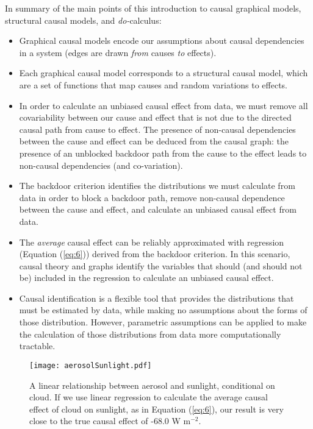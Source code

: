 \documentclass[12pt]{article}
\begin{document}
In summary of the main points of this introduction to causal graphical
models, structural causal models, and \textit{do-}calculus:

\begin{itemize}
\item Graphical causal models encode our assumptions about causal
  dependencies in a system (edges are drawn \emph{from} causes
  \emph{to} effects).
\item Each graphical causal model corresponds to a structural causal
  model, which are a set of functions that map causes and random
  variations to effects.
\item In order to calculate an unbiased causal effect from data, we
  must remove all covariability between our cause and effect that is
  not due to the directed causal path from cause to effect. The
  presence of non-causal dependencies between the cause and effect can
  be deduced from the causal graph: the presence of an unblocked
  backdoor path from the cause to the effect leads to non-causal
  dependencies (and co-variation).
\item The backdoor criterion identifies the distributions we must
  calculate from data in order to block a backdoor path, remove
  non-causal dependence between the cause and effect, and calculate an
  unbiased causal effect from data.
\item The \emph{average} causal effect can be reliably approximated
  with regression (Equation (\ref{eq:6})) derived from the backdoor
  criterion. In this scenario, causal theory and graphs identify the
  variables that should (and should not be) included in the regression
  to calculate an unbiased causal effect.
\item Causal identification is a flexible tool that provides the
  distributions that must be estimated by data, while making no
  assumptions about the forms of those distribution. However,
  parametric assumptions can be applied to make the calculation of
  those distributions from data more computationally tractable.
\end{itemize}

\begin{figure}
  \texttt{[image: aerosolSunlight.pdf]}
  \caption{A linear relationship between aerosol and sunlight,
    conditional on cloud. If we use linear regression to calculate the
    average causal effect of cloud on sunlight, as in Equation
    (\ref{eq:6}), our result is very close to the true causal effect
    of -68.0 W m$^{-2}$.}
  \label{fig:linear}
\end{figure}
\end{document}
